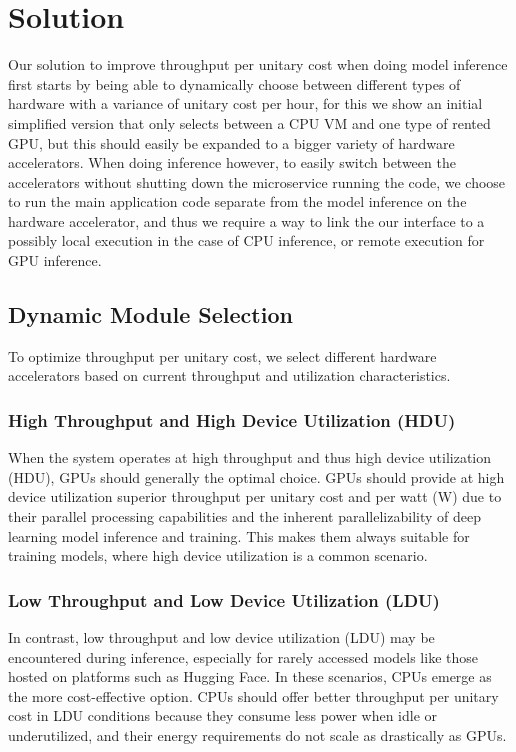 


\section{Solution}
\label{solution}

Our solution to improve throughput per unitary cost when doing model inference first starts by being able to dynamically choose between different types of hardware with a variance of unitary cost per hour, for this we show an initial simplified version that only selects between a CPU VM and one type of rented GPU, but this should easily be expanded to a bigger variety of hardware accelerators. When doing inference however, to easily switch between the accelerators without shutting down the microservice running the code, we choose to run the main application code separate from the model inference on the hardware accelerator, and thus we require a way to link the our interface to a possibly local execution in the case of CPU inference, or remote execution for GPU inference.


\subsection{Dynamic Module Selection}

To optimize throughput per unitary cost, we select different hardware accelerators based on current throughput and utilization characteristics.

\subsubsection{High Throughput and High Device Utilization (HDU)}

When the system operates at high throughput and thus high device utilization (HDU), GPUs should generally the optimal choice. GPUs should provide at high device utilization superior throughput per unitary cost and per watt (W) due to their parallel processing capabilities and the inherent parallelizability of deep learning model inference and training.
This makes them always suitable for training models, where high device utilization is a common scenario.

\subsubsection{Low Throughput and Low Device Utilization (LDU)}

In contrast, low throughput and low device utilization (LDU) may be encountered during inference, especially for rarely accessed models like those hosted on platforms such as Hugging Face. In these scenarios, CPUs emerge as the more cost-effective option. CPUs should offer better throughput per unitary cost in LDU conditions because they consume less power when idle or underutilized, and their energy requirements do not scale as drastically as GPUs.

